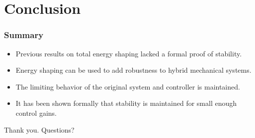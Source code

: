 \section{Conclusion}
\showtoc

\begin{frame}[t]
  \frametitle{Summary}
  \begin{itemize}
  \item Previous results on total energy shaping lacked a formal proof of
    stability.
  \item Energy shaping can be used to add robustness to hybrid mechanical
    systems.
  \item The limiting behavior of the original system and controller is
    maintained.
  \item It has been shown formally that stability is maintained for small enough
    control gains.
  \end{itemize}
\end{frame}

\begin{frame}
  \centering
  \LARGE{Thank you. Questions?}
\end{frame}
